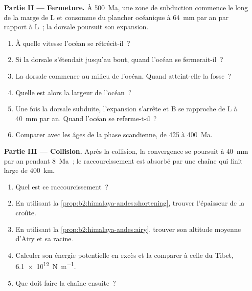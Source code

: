 \begin{problem}
\noindent\textbf{Partie II --- Fermeture.} À \qty{500}{Ma}, une zone de subduction commence le long de la
marge de L et consomme du plancher océanique à \qty{64}{mm} par an par rapport à L~; la dorsale poursuit son
expansion.
\begin{enumerate}[resume]
\item À quelle vitesse l'océan se rétrécit-il~?
\item Si la dorsale s'étendait jusqu'au bout, quand l'océan se fermerait-il~?
\item La dorsale commence au milieu de l'océan. Quand atteint-elle la fosse~?
\item Quelle est alors la largeur de l'océan~?
\item Une fois la dorsale subduite, l'expansion s'arrête et B se rapproche de L à \qty{40}{mm} par
an. Quand l'océan se referme-t-il~?
\item Comparer avec les âges de la phase scandienne, de 425 à \qty{400}{Ma}.
\end{enumerate}

\noindent\textbf{Partie III --- Collision.} Après la collision, la convergence se poursuit à
\qty{40}{mm} par an pendant \qty{8}{Ma}~; le raccourcissement est absorbé par une chaîne qui finit
large de \qty{400}{km}.
\begin{enumerate}[resume]
\item Quel est ce raccourcissement~?
\item En utilisant la \cref{prop:b2:himalaya-andes:shortening}, trouver l'épaisseur de la croûte.
\item En utilisant la \cref{prop:b2:himalaya-andes:airy}, trouver son altitude moyenne d'Airy et sa racine.
\item Calculer son énergie potentielle en excès et la comparer à celle du Tibet,
\qty{6.1e12}{N.m^{-1}}.
\item Que doit faire la chaîne ensuite~?
\end{enumerate}


\end{problem}

